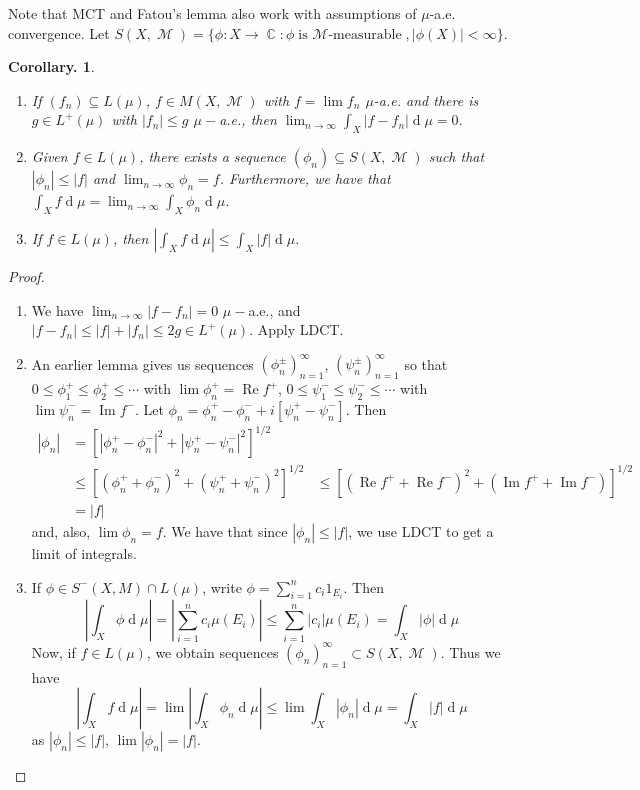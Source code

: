 \documentclass[11pt, a4paper]{memoir}
\DeclareMathOperator{\C}{{\mathbb{C}}}
\theoremstyle{change}
\newtheorem{corollary}[theorem]{Corollary.}
\theoremstyle{plain}
\theoremstyle{nonumberplain}
\newtheorem{proof}{Proof}
\DeclareMathOperator{\M}{{\mathcal{M}}}
\renewcommand{\Re}{\ensuremath{\operatorname{Re}}}
\renewcommand{\Im}{\ensuremath{\operatorname{Im}}}
\renewcommand{\d}[1]{\ensuremath{\operatorname{d}\!{#1}}}
\numberwithin{equation}{section}
\begin{document}
Note that MCT and Fatou's lemma also work with assumptions of $\mu$-a.e. convergence.
Let $S(X,\M)=\{\phi:X\to\C:\phi\text{is $\M$-measurable},|\phi(X)|<\infty\}$.
\begin{corollary}
    \begin{enumerate}[nolistsep]
        \item If $(f_n)\subseteq L(\mu)$, $f\in M(X,\M)$ with $f=\lim f_n$ $\mu$-a.e. and there is $g\in L^+(\mu)$ with $|f_n|\leq g$ $\mu-$a.e., then $\lim_{n\to\infty}\int_X|f-f_n|\d{\mu}=0$.
        \item Given $f\in L(\mu)$, there exists a sequence $(\phi_n)\subseteq S(X,\M)$ such that $|\phi_n|\leq|f|$ and $\lim_{n\to\infty}\phi_n=f$.
            Furthermore, we have that $\int_Xf\d{\mu}=\lim_{n\to\infty}\int_X\phi_n\d{\mu}$.
        \item If $f\in L(\mu)$, then $|\int_Xf\d{\mu}|\leq\int_X|f|\d{\mu}$.
    \end{enumerate}
\end{corollary}
\begin{proof}
    \begin{enumerate}
        \item We have $\lim_{n\to\infty}|f-f_n|=0$ $\mu-$a.e., and $|f-f_n|\leq|f|+|f_n|\leq 2g\in L^+(\mu)$.
            Apply LDCT.
        \item An earlier lemma gives us sequences $(\phi_n^\pm)_{n=1}^\infty$, $(\psi_n^\pm)_{n=1}^\infty$ so that $0\leq\phi_1^+\leq\phi_2^+\leq\cdots$ with $\lim\phi_n^+=\Re f^+$, $0\leq\psi_1^-\leq\psi_2^-\leq\cdots$ with $\lim \psi_n^-=\Im f^-$.
            Let $\phi_n=\phi_n^+-\phi_n^-+i[\psi_n^+-\psi_n^-]$.
            Then
            \begin{align*}
                |\phi_n|&=[|\phi_n^+-\phi_n^-|^2+|\psi_n^+-\psi_n^-|^2]^{1/2}\\
                        &\leq[(\phi_n^++\phi_n^-)^2+(\psi_n^++\psi_n^-)^2]^{1/2}
                        &\leq\left[(\Re f^++\Re f^-)^2+(\Im f^++\Im f^-)\right]^{1/2}\\
                        &= |f|
            \end{align*}
            and, also, $\lim\phi_n=f$.
            We have that since $|\phi_n|\leq|f|$, we use LDCT to get a limit of integrals.
        \item If $\phi\in S^-(X,M)\cap L(\mu)$, write $\phi=\sum_{i=1}^nc_i1_{E_i}$.
            Then
            \begin{equation*}
                |\int_X\phi\d{\mu}|=|\sum_{i=1}^nc_i\mu(E_i)|\leq\sum_{i=1}^n|c_i|\mu(E_i)=\int_X|\phi|\d{\mu}
            \end{equation*}
            Now, if $f\in L(\mu)$, we obtain sequences $(\phi_n)_{n=1}^\infty\subset S(X,\M)$.
            Thus we have
            \begin{equation*}
                |\int_Xf\d{\mu}|=\lim|\int_X\phi_n\d{\mu}|\leq\lim\int_X|\phi_n|\d{\mu}=\int_X|f|\d{\mu}
            \end{equation*}
            as $|\phi_n|\leq|f|$, $\lim |\phi_n|=|f|$.
    \end{enumerate}
\end{proof}
\end{document}
